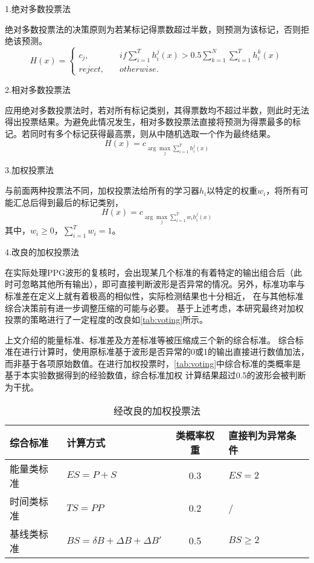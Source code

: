 1.绝对多数投票法

绝对多数投票法的决策原则为若某标记得票数超过半数，则预测为该标记，否则拒绝该预测。
\begin{equation}
    \label{equ:mvoting}
    H(x)=
    \left \{
    \begin{aligned}
        c_j,&\quad if \sum_{i=1}^T{h_i^j(x)}>0.5\sum_{k=1}^N{\sum_{i=1}^T}{h_i^k(x)}\\
        reject,&\quad otherwise.
    \end{aligned}
    \right.
\end{equation}

2.相对多数投票法

应用绝对多数投票法时，若对所有标记类别，其得票数均不超过半数，则此时无法得出投票结果。为避免此情况发生，相对多数投票法直接将预测为得票最多的标记。若同时有多个标记获得最高票，则从中随机选取一个作为最终结果。
\begin{equation}
    \label{equ:pvoting}
    H(x)=c_{\arg \max\limits_{j} \sum_{i=1}^T{h_i^j(x)}}
\end{equation}

3.加权投票法

与前面两种投票法不同，加权投票法给所有的学习器$h_i$以特定的权重$w_i$，将所有可能汇总后得到最后的标记类别，
\begin{equation}
    \label{equ:wvoting}
    H(x)=c_{\arg \max\limits_{j} \sum_{i=1}^T{w_ih_i^j(x)}}
\end{equation}
其中，$w_i\ge0$，$\sum_{i=1}^T{w_i=1}$。

4.改良的加权投票法

在实际处理PPG波形的复核时，会出现某几个标准的有着特定的输出组合后（此时可忽略其他所有输出），即可直接判断波形是否异常的情况。另外，标准功率与标准差在定义上就有着极高的相似性，实际检测结果也十分相近，
在与其他标准综合决策前有进一步调整压缩的可能与必要。
基于上述考虑，本研究最终对加权投票的策略进行了一定程度的改良如\autoref{tab:voting}所示。

上文介绍的能量标准、标准差及方差标准等被压缩成三个新的综合标准。
综合标准在进行计算时，使用原标准基于波形是否异常的0或1的输出直接进行数值加法，而非基于各项原始数值。在进行加权投票时，\autoref{tab:voting}中综合标准的类概率是基于本实验数据得到的经验数值，综合标准加权
计算结果超过0.5的波形会被判断为干扰。
\begin{table}[htbp]
    \centering
    \caption{\label{tab:voting}经改良的加权投票法}
    \begin{tabularx}{\linewidth}{X<{\centering}X<{\centering}cX<{\centering}}
        \toprule
        \textbf{综合标准}&\textbf{计算方式}&\textbf{类概率权重}&\textbf{直接判为异常条件}\\
        \midrule
        能量类标准&     $ES=P+S$               &0.3& $ES =2$ \\
        时间类标准&     $TS=PP$&0.2&/\\
        基线类标准&     $BS=\delta B+\Delta B+\Delta B'$&0.5& $BS\ge 2$  \\
        \bottomrule
    \end{tabularx}
\end{table}

